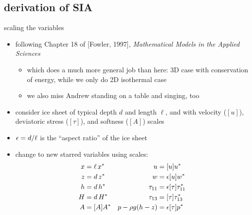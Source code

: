 \subsection{derivation of SIA}


\begin{frame}{scaling the variables}
\label{slide:siascalings}

\begin{itemize}
\item following Chapter 18 of [Fowler, 1997]\nocite{Fowler}, \emph{Mathematical Models in the Applied Sciences}
  \begin{itemize}
    \scriptsize
    \item which does a much more general job than here: 3D case with conservation of energy, while we only do 2D isothermal case
    \item we also miss Andrew standing on a table and singing, too
    \normalsize
  \end{itemize}
\item consider ice sheet of typical depth $d$ and length $\ell$, and with velocity ($[u]$), deviatoric stress ($[\tau]$), and softness ($[A]$) scales
\item $\epsilon = d/\ell$ is the ``aspect ratio'' of the ice sheet
\item change to new starred variables using scales:\small
\begin{align*}
x &= \ell\, x^* &         u &= [u] u^* \\
z &= d\, z^*    &         w &= \epsilon [u] w^* \\
h &= d\, h^*    & \tau_{11} &= \epsilon [\tau] \tau_{11}^* \\
H &= d\, H^*    & \tau_{13} &= [\tau] \tau_{13}^* \\
A &= [A] A^*  & p - \rho g (h-z) &= \epsilon [\tau] p^*
\end{align*}
\normalsize
\end{itemize}
\end{frame}


